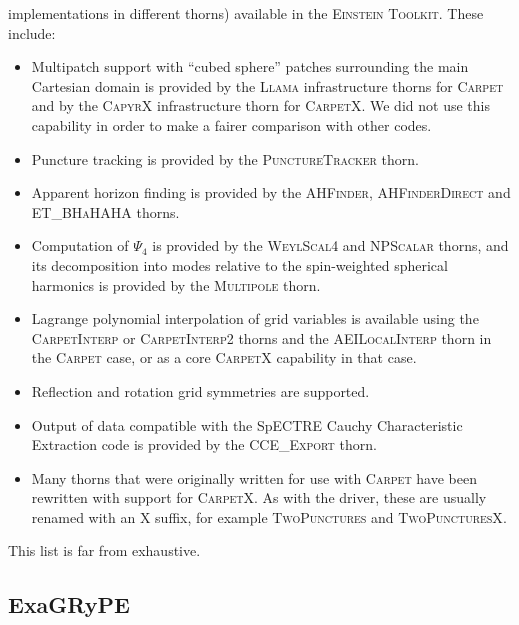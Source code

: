 \documentclass[12pt,a4paper]{article}
\numberwithin{figure}{subsection}
\newcommand{\einsteintoolkit}{\textsc{Einstein Toolkit}\xspace}
\newcommand{\carpet}{\textsc{Carpet}\xspace}
\newcommand{\carpetx}{\textsc{CarpetX}\xspace}
\begin{document}
implementations in different thorns) available in the \einsteintoolkit. These
include:
\begin{itemize}
    \item Multipatch support with ``cubed sphere'' patches surrounding the main
    Cartesian domain is provided by the \textsc{Llama}
    \cite{Pollney:2009yz} infrastructure thorns for \carpet and by the
    \textsc{CapyrX} \cite{Sanches:2026a} infrastructure thorn for \carpetx. We
    did not use this capability in order to make a fairer comparison with other
    codes.
    \item Puncture tracking is provided by the \textsc{PunctureTracker} thorn.
    \item Apparent horizon finding is provided by the \textsc{AHFinder},
    \textsc{AHFinderDirect} \cite{Thornburg:1995cp} and \textsc{ET\_BHaHAHA}
    \cite{Etienne:2025auk} thorns.
    \item Computation of $\Psi_4$ is provided by the \textsc{WeylScal4} and
    \textsc{NPScalar} thorns, and its decomposition into modes relative to the
    spin-weighted spherical harmonics is provided by the \textsc{Multipole}
    thorn.
    \item Lagrange polynomial interpolation of grid variables is available
    using the \textsc{CarpetInterp} or \textsc{CarpetInterp2} thorns and the
    \textsc{AEILocalInterp} thorn in the \carpet case, or as a core \carpetx
    capability in that case.
    \item Reflection and rotation grid symmetries are supported.
    \item Output of data compatible with the SpECTRE Cauchy Characteristic
    Extraction code \cite{Moxon:2021gbv} is provided by the \textsc{CCE\_Export}
    thorn.
    \item Many thorns that were originally written for use with \carpet have
    been rewritten with support for \carpetx. As with the driver, these are
    usually renamed with an X suffix, for example \textsc{TwoPunctures}
    \cite{Ansorg:2004ds} and \textsc{TwoPuncturesX}.
\end{itemize}
This list is far from exhaustive.

\subsection{ExaGRyPE}
\end{document}
